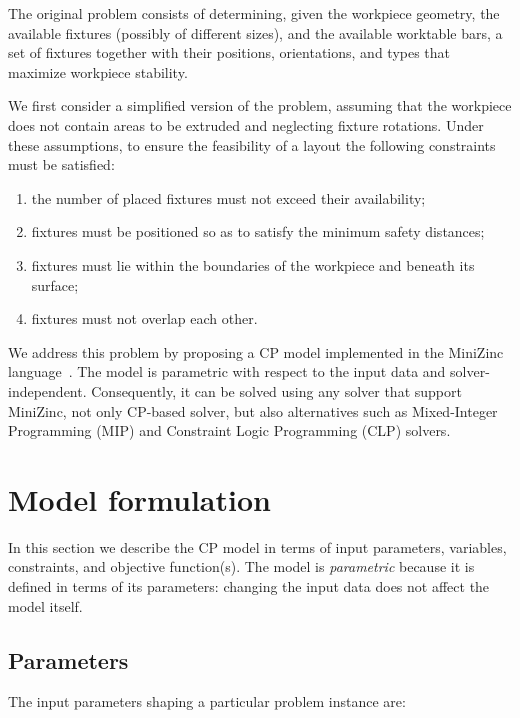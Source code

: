 \label{chap:pt1_chapter5}
The original problem consists of determining, given the workpiece geometry, the available fixtures (possibly of different sizes), and the available worktable bars, a set of fixtures together with their positions, orientations, and types that maximize workpiece stability.

We first consider a simplified version of the problem, assuming that the workpiece does not contain areas to be extruded and neglecting fixture rotations. Under these assumptions, to ensure the feasibility of a layout the following constraints must be satisfied:
\begin{enumerate}
	\item the number of placed fixtures must not exceed their availability;
	\item fixtures must be positioned so as to satisfy the minimum safety distances;
	\item fixtures must lie within the boundaries of the workpiece and beneath its surface;
	\item fixtures must not overlap each other.
\end{enumerate}

We address this problem by proposing a CP model implemented in the MiniZinc language~\cite{nethercote2007minizinc}. The model is parametric with respect to the input data and solver-independent. Consequently, it can be solved using any solver that support MiniZinc, not only CP-based solver, but also alternatives such as Mixed-Integer Programming (MIP) and Constraint Logic Programming (CLP) solvers.

\section{Model formulation}
\label{sec:first_cp_model}
In this section we describe the CP model in terms of input parameters, variables, constraints, and objective function(s). 
The model is \emph{parametric} because it is defined in terms of its parameters: changing the input data does not affect the model itself.

\subsection{Parameters}
\label{sec:first_parameters}
The input parameters shaping a particular problem instance are:

